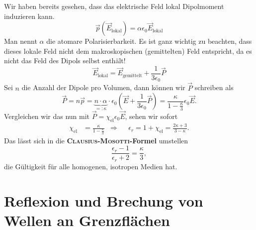 Wir haben bereits gesehen, dass das elektrische Feld lokal Dipolmoment induzieren kann.
\begin{equation*}
\vec{p}\left(\vec{E}_\text{lokal}\right) = \alpha\epsilon_0\vec{E}_\text{lokal}
\end{equation*}
Man nennt $\alpha$ die atomare Polarisierbarkeit. Es ist ganz wichtig zu beachten, dass dieses lokale Feld nicht dem makroskopischen (gemittelten) Feld entspricht, da es nicht das Feld des Dipols selbst enthält! \\
\begin{equation*}
\vec{E}_\text{lokal}=\vec{E}_\text{gemittelt} + \frac{1}{3\epsilon_0}\vec{P}
\end{equation*}
Sei $n$ die Anzahl der Dipole pro Volumen, dann können wir $\vec{P}$ schreiben als
\begin{equation*}
\vec{P}=n\vec{p} = \underbrace{n\cdot\alpha}_{=:\kappa}\cdot\epsilon_0\left(\vec{E}+\frac{1}{3\epsilon_0}\vec{P}\right) =\frac{\kappa}{1-\frac{\kappa}{3}}\epsilon_0\vec{E}.
\end{equation*}
Vergleichen wir das nun mit $\vec{P}=\chi_\text{el}\epsilon_0\vec{E}$, sehen wir sofort
\begin{align*}
\chi_\text{el}&=\frac{\kappa}{1-\frac{\kappa}{3}} &\Rightarrow& &\epsilon_r = 1+ \chi_\text{el}=\frac{2\kappa+3}{3-\kappa}.
\end{align*}
Das lässt sich in die \textbf{\textsc{Clausius-Mosotti}-Formel} umstellen
\begin{equation*}
\frac{\epsilon_r-1}{\epsilon_r+2}=\frac{\kappa}{3},
\end{equation*}
die Gültigkeit für alle homogenen, isotropen Medien hat.

\section[Wellen an Grenzflächen]{Reflexion und Brechung von Wellen an Grenzflächen}

